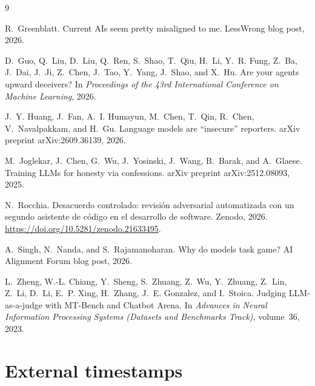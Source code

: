 \documentclass[11pt]{article}
\begin{document}
\begin{thebibliography}{9}

R.~Greenblatt.
\newblock Current {AI}s seem pretty misaligned to me.
\newblock LessWrong blog post, 2026.

D.~Guo, Q.~Liu, D.~Liu, Q.~Ren, S.~Shao, T.~Qiu, H.~Li, Y.~R. Fung, Z.~Ba, J.~Dai,
J.~Ji, Z.~Chen, J.~Tao, Y.~Yang, J.~Shao, and X.~Hu.
\newblock Are your agents upward deceivers?
\newblock In \emph{Proceedings of the 43rd International Conference on Machine
Learning}, 2026.

J.~Y. Huang, J.~Fan, A.~I. Humayun, M.~Chen, T.~Qin, R.~Chen, V.~Navalpakkam, and
H.~Gu.
\newblock Language models are ``insecure'' reporters.
\newblock arXiv preprint arXiv:2609.36139, 2026.

M.~Joglekar, J.~Chen, G.~Wu, J.~Yosinski, J.~Wang, B.~Barak, and A.~Glaese.
\newblock Training {LLM}s for honesty via confessions.
\newblock arXiv preprint arXiv:2512.08093, 2025.

N.~Rocchia.
\newblock Desacuerdo controlado: revisi\'on adversarial automatizada con un segundo
asistente de c\'odigo en el desarrollo de software.
\newblock Zenodo, 2026. \url{https://doi.org/10.5281/zenodo.21633495}.

A.~Singh, N.~Nanda, and S.~Rajamanoharan.
\newblock Why do models task game?
\newblock AI Alignment Forum blog post, 2026.

L.~Zheng, W.-L. Chiang, Y.~Sheng, S.~Zhuang, Z.~Wu, Y.~Zhuang, Z.~Lin, Z.~Li, D.~Li,
E.~P. Xing, H.~Zhang, J.~E. Gonzalez, and I.~Stoica.
\newblock Judging {LLM}-as-a-judge with {MT}-Bench and {C}hatbot {A}rena.
\newblock In \emph{Advances in Neural Information Processing Systems (Datasets and
Benchmarks Track)}, volume~36, 2023.

\end{thebibliography}

\appendix
\section{External timestamps}
\label{app:timestamps}
\end{document}
